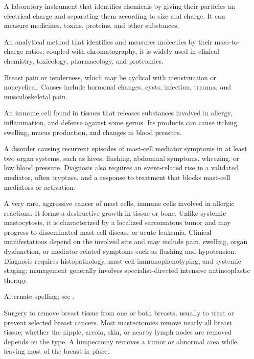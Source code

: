  A laboratory instrument that identifies chemicals by giving their particles an electrical charge and separating them according to size and charge. It can measure medicines, toxins, proteins, and other substances.

 An analytical method that identifies and measures molecules by their mass-to-charge ratios; coupled with chromatography, it is widely used in clinical chemistry, toxicology, pharmacology, and proteomics.

 Breast pain or tenderness, which may be cyclical with menstruation or noncyclical. Causes include hormonal changes, cysts, infection, trauma, and musculoskeletal pain.

 An immune cell found in tissues that releases substances involved in allergy, inflammation, and defense against some germs. Its products can cause itching, swelling, mucus production, and changes in blood pressure.

 A disorder causing recurrent episodes of mast-cell mediator symptoms in at least two organ systems, such as hives, flushing, abdominal symptoms, wheezing, or low blood pressure. Diagnosis also requires an event-related rise in a validated mediator, often tryptase, and a response to treatment that blocks mast-cell mediators or activation.

 A very rare, aggressive cancer of mast cells, immune cells involved in allergic reactions. It forms a destructive growth in tissue or bone.
Unlike systemic mastocytosis, it is characterized by a localized sarcomatous tumor and may progress to disseminated mast-cell disease or acute leukemia.
Clinical manifestations depend on the involved site and may include pain, swelling, organ dysfunction, or mediator-related symptoms such as flushing and hypotension.
Diagnosis requires histopathology, mast-cell immunophenotyping, and systemic staging; management generally involves specialist-directed intensive antineoplastic therapy.

 Alternate spelling; see .

 Surgery to remove breast tissue from one or both breasts, usually to treat or prevent selected breast cancers. Most mastectomies remove nearly all breast tissue; whether the nipple, areola, skin, or nearby lymph nodes are removed depends on the type. A lumpectomy removes a tumor or abnormal area while leaving most of the breast in place.

